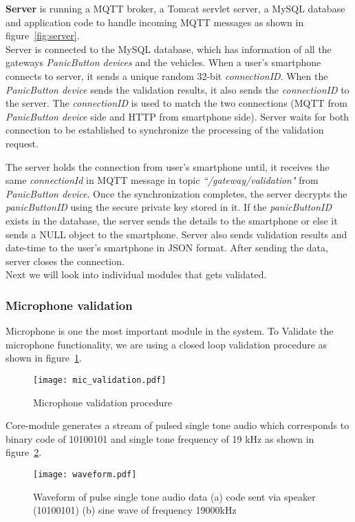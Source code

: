 \textbf{Server} is running a MQTT broker, a Tomcat servlet server, a MySQL database and application code to handle incoming MQTT messages as shown in figure~\ref{fig:server}.\\
Server is connected to the MySQL database, which has information of all the gateways \emph{PanicButton devices} and the vehicles. When a user's smartphone connects to server, it sends a unique random 32-bit \emph{connectionID}. When the \emph{PanicButton device} sends the validation results, it also sends the \emph{connectionID} to the server. The \emph{connectionID} is used to match the two connections (MQTT from \emph{PanicButton device} side and HTTP from smartphone side). Server waits for both connection to be established to synchronize the processing of the validation request.
 
The server holds the connection from user's smartphone until, it receives the same \emph{connectionId} in MQTT message in topic \emph{``/gateway/validation"} from \emph{PanicButton device}. Once the synchronization completes, the server decrypts the \emph{panicButtonID} using the secure private key stored in it. If the \emph{panicButtonID} exists in the database, the server sends the details to the smartphone or else it sends a NULL object to the smartphone. Server also sends validation results and date-time to the user's smartphone in JSON format. After sending the data, server closes the connection.\\


Next we will look into individual modules that gets validated.

\subsubsection{Microphone validation}
Microphone is one the most important module in the system. To Validate the microphone functionality, we are using a closed loop validation procedure as shown in figure~\ref{fig:mic_validation}.
\begin{figure}[H]
\centering
\texttt{[image: mic\_validation.pdf]}
\caption{Microphone validation procedure}
\label{fig:mic_validation}
\end{figure}
Core-module generates a stream of pulsed single tone audio which corresponds to binary code of 10100101 and single tone frequency of 19 kHz as shown in figure~\ref{fig:waveform}.\\
\begin{figure}[H]
\texttt{[image: waveform.pdf]}
\caption{Waveform of pulse single tone audio data (a) code sent via speaker (10100101) (b) sine wave of frequency 19000kHz}
\label{fig:waveform}
\end{figure}
